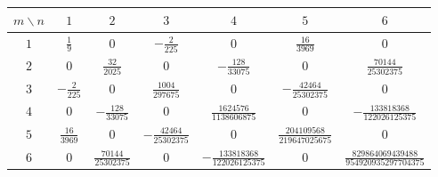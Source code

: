 \begin{center}
\scriptsize
\renewcommand{\arraystretch}{1.35}
\begin{tabular}{ccccccc}
\toprule
$m\backslash n$ & $1$ & $2$ & $3$ & $4$ & $5$ & $6$ \\
\midrule
$1$ & $ \frac{1}{9} $ & $ 0 $ & $ - \frac{2}{225} $ & $ 0 $ & $ \frac{16}{3969} $ & $ 0 $ \\
$2$ & $ 0 $ & $ \frac{32}{2025} $ & $ 0 $ & $ - \frac{128}{33075} $ & $ 0 $ & $ \frac{70144}{25302375} $ \\
$3$ & $ - \frac{2}{225} $ & $ 0 $ & $ \frac{1004}{297675} $ & $ 0 $ & $ - \frac{42464}{25302375} $ & $ 0 $ \\
$4$ & $ 0 $ & $ - \frac{128}{33075} $ & $ 0 $ & $ \frac{1624576}{1138606875} $ & $ 0 $ & $ - \frac{133818368}{122026125375} $ \\
$5$ & $ \frac{16}{3969} $ & $ 0 $ & $ - \frac{42464}{25302375} $ & $ 0 $ & $ \frac{204109568}{219647025675} $ & $ 0 $ \\
$6$ & $ 0 $ & $ \frac{70144}{25302375} $ & $ 0 $ & $ - \frac{133818368}{122026125375} $ & $ 0 $ & $ \frac{829864069439488}{954920935297704375} $ \\
\bottomrule
\end{tabular}
\end{center}
